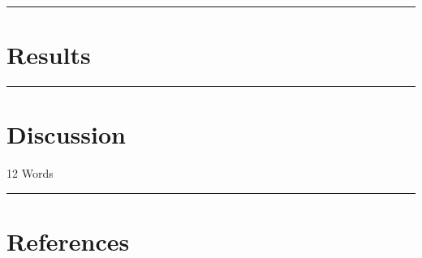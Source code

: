 \documentclass[
  11pt,
]{article}
\begin{document}
\begin{center}\rule{0.5\linewidth}{0.5pt}\end{center}

\hypertarget{results}{%
\section{Results}\label{results}}

\begin{center}\rule{0.5\linewidth}{0.5pt}\end{center}

\hypertarget{discussion}{%
\section{Discussion}\label{discussion}}

\begin{flushright}
12 Words
\end{flushright}

\begin{center}\rule{0.5\linewidth}{0.5pt}\end{center}

\hypertarget{references}{%
\section{References}\label{references}}
\end{document}
